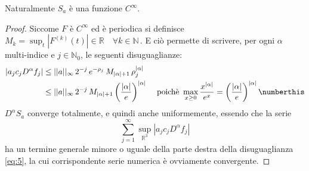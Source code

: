 \begin{example}
\begin{remark}
Naturalmente $S_a$ è una funzione $C^\infty$.
\end{remark}

\begin{proof}
Siccome $F$ è $C^\infty$ ed è periodica si definisce $M_k=\sup_t|F^{(k)}(t)| \in \mathbb{R} \quad \forall k \in \mathbb{N}\, .$
E ciò permette di scrivere, per ogni $\alpha$ multi-indice e $j\in \mathbb{N}_0$, le seguenti disuguaglianze:
\begin{align*}
|a_jc_jD^{\alpha}f_j| &\leq ||a||_\infty \, 2^{-j} \, e^{-\rho_j} \, M_{| \alpha |+1} \, \rho_j^{| \alpha |} \\
&\leq ||a||_\infty \, 2^{-j} \, M_{| \alpha |+1} \left(\frac{| \alpha |}{e}\right)^{| \alpha |}& \text{ poichè } \max\limits_{x \geq 0}\frac{x^{| \alpha |}}{e^x} = \left(\frac{| \alpha |}{e}\right)^{| \alpha |} \label{eq:5}\numberthis
\end{align*}
$D^\alpha S_a$ converge totalmente, e quindi anche uniformemente, essendo che la serie $$\sum_{j=1}^{\infty} \sup\limits_{\mathbb{R}^3} |a_jc_j D^{\alpha} f_j|$$ ha un termine generale minore o uguale della parte destra della disuguaglianza \eqref{eq:5}, la cui corrispondente serie numerica è ovviamente convergente.

\end{proof}


\end{example}
